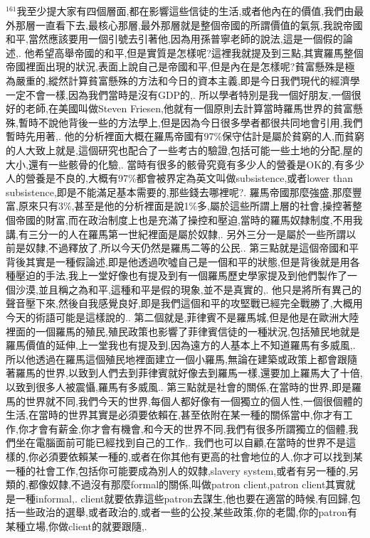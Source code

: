 \documentclass{book}
\begin{document}
$^{161}$我至少提大家有四個層面,都在影響這些信徒的生活,或者他內在的價值,我們由最外那層一直看下去,最核心那層,最外那層就是整個帝國的所謂價值的氣氛,我說帝國和平,當然應該要用一個引號去引著他,因為用孫普寧老師的說法,這是一個假的論述,.
他希望高舉帝國的和平,但是實質是怎樣呢?這裡我就提及到三點,其實羅馬整個帝國裡面出現的狀況,表面上說自己是帝國和平,但是內在是怎樣呢?貧富懸殊是極為嚴重的,縱然計算貧富懸殊的方法和今日的資本主義,即是今日我們現代的經濟學一定不會一樣,因為我們當時是沒有GDP的,.
所以學者特別是我一個好朋友,一個很好的老師,在美國叫做Steven Friesen,他就有一個原則去計算當時羅馬世界的貧富懸殊,暫時不說他背後一些的方法學上,但是因為今日很多學者都很共同地會引用,我們暫時先用著,.
他的分析裡面大概在羅馬帝國有97\%保守估計是屬於貧窮的人,而貧窮的人大致上就是,這個研究也配合了一些考古的驗證,包括可能一些土地的分配,屋的大小,還有一些骸骨的化驗,.
當時有很多的骸骨究竟有多少人的營養是OK的,有多少人的營養是不良的,大概有97\%都會被界定為英文叫做subsistence,或者lower than subsistence,即是不能滿足基本需要的,那些錢去哪裡呢?.
羅馬帝國那麼強盛,那麼豐富,原來只有3\%,甚至是他的分析裡面是說1\%多,屬於這些所謂上層的社會,操控著整個帝國的財富,而在政治制度上也是充滿了操控和壓迫,當時的羅馬奴隸制度,不用我講,有三分一的人在羅馬第一世紀裡面是屬於奴隸,.
另外三分一是屬於一些所謂以前是奴隸,不過釋放了,所以今天仍然是羅馬二等的公民..
第三點就是這個帝國和平背後其實是一種假論述,即是他透過吹噓自己是一個和平的狀態,但是背後就是用各種壓迫的手法,我上一堂好像也有提及到有一個羅馬歷史學家提及到他們製作了一個沙漠,並且稱之為和平,這種和平是假的現象,並不是真實的,.
他只是將所有異己的聲音壓下來,然後自我感覺良好,即是我們這個和平的攻堅戰已經完全戰勝了,大概用今天的術語可能是這樣說的..
第二個就是,菲律賓不是羅馬城,但是他是在歐洲大陸裡面的一個羅馬的殖民,殖民政策也影響了菲律賓信徒的一種狀況,包括殖民地就是羅馬價值的延伸,上一堂我也有提及到,因為遠方的人基本上不知道羅馬有多威風,.
所以他透過在羅馬這個殖民地裡面建立一個小羅馬,無論在建築或政策上都會跟隨著羅馬的世界,以致到人們去到菲律賓就好像去到羅馬一樣,還要加上羅馬大了十倍,以致到很多人被震懾,羅馬有多威風..
第三點就是社會的關係,在當時的世界,即是羅馬的世界就不同,我們今天的世界,每個人都好像有一個獨立的個人性,一個很個體的生活,在當時的世界其實是必須要依賴在,甚至依附在某一種的關係當中,你才有工作,你才會有薪金,你才會有機會,和今天的世界不同,我們有很多所謂獨立的個體,我們坐在電腦面前可能已經找到自己的工作,.
我們也可以自顧,在當時的世界不是這樣的,你必須要依賴某一種的,或者在你其他有更高的社會地位的人,你才可以找到某一種的社會工作,包括你可能要成為別人的奴隸,slavery system,或者有另一種的,另類的,都像奴隸,不過沒有那麼formal的關係,叫做patron client,patron client其實就是一種informal,.
client就要依靠這些patron去謀生,他也要在適當的時候,有回歸,包括一些政治的選舉,或者政治的,或者一些的公投,某些政策,你的老闆,你的patron有某種立場,你做client的就要跟隨,.
\end{document}
